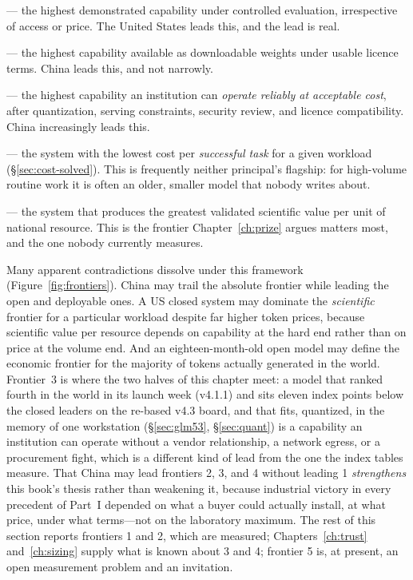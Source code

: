 \begin{description}\itemsep2pt
  \item[1. The absolute frontier] --- the highest demonstrated capability under controlled evaluation, irrespective of access or price. The United States leads this, and the lead is real.
  \item[2. The open frontier] --- the highest capability available as downloadable weights under usable licence terms. China leads this, and not narrowly.
  \item[3. The deployable frontier] --- the highest capability an institution can \emph{operate reliably at acceptable cost}, after quantization, serving constraints, security review, and licence compatibility. China increasingly leads this.
  \item[4. The economic frontier] --- the system with the lowest cost per \emph{successful task} for a given workload (\S\ref{sec:cost-solved}). This is frequently neither principal's flagship: for high-volume routine work it is often an older, smaller model that nobody writes about.
  \item[5. The scientific frontier] --- the system that produces the greatest validated scientific value per unit of national resource. This is the frontier Chapter~\ref{ch:prize} argues matters most, and the one nobody currently measures.
\end{description}



Many apparent contradictions dissolve under this framework (Figure~\ref{fig:frontiers}). China may trail the absolute frontier while leading the open and deployable ones. A US closed system may dominate the \emph{scientific} frontier for a particular workload despite far higher token prices, because scientific value per resource depends on capability at the hard end rather than on price at the volume end. And an eighteen-month-old open model may define the economic frontier for the majority of tokens actually generated in the world. Frontier~3 is where the two halves of this chapter meet: a model that ranked fourth in the world in its launch week (v4.1.1) and sits eleven index points below the closed leaders on the re-based v4.3 board, and that fits, quantized, in the memory of one workstation (\S\ref{sec:glm53}, \S\ref{sec:quant}) is a capability an institution can operate without a vendor relationship, a network egress, or a procurement fight, which is a different kind of lead from the one the index tables measure. That China may lead frontiers 2, 3, and 4 without leading 1 \emph{strengthens} this book's thesis rather than weakening it, because industrial victory in every precedent of Part~I depended on what a buyer could actually install, at what price, under what terms---not on the laboratory maximum. The rest of this section reports frontiers 1 and 2, which are measured; Chapters~\ref{ch:trust} and~\ref{ch:sizing} supply what is known about 3 and 4; frontier 5 is, at present, an open measurement problem and an invitation.

